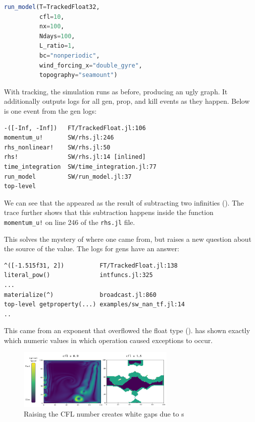 \documentclass{juliacon}
\begin{document}
\begin{lstlisting}[language = Julia]
run_model(T=TrackedFloat32,
          cfl=10,
          nx=100,
          Ndays=100,
          L_ratio=1,
          bc="nonperiodic",
          wind_forcing_x="double_gyre",
          topography="seamount")
\end{lstlisting}

With tracking, the simulation runs as before, producing an ugly graph.
It additionally outputs logs for all gen, prop, and kill events
as they happen.
Below is one event from the gen logs:

\begin{lstlisting}
-([-Inf, -Inf])   FT/TrackedFloat.jl:106
momentum_u!       SW/rhs.jl:246
rhs_nonlinear!    SW/rhs.jl:50
rhs!              SW/rhs.jl:14 [inlined]
time_integration  SW/time_integration.jl:77
run_model         SW/run_model.jl:37
top-level
\end{lstlisting}

We can see that the \NaN{} appeared as the result of subtracting two infinities ().
The trace further shows that this subtraction happens inside the function \texttt{momentum\_u!} on line 246 of the \texttt{rhs.jl} file.

This solves the mystery of where one \NaN{} came from, but raises a new question
about the source of the \Inf{} value.
The logs for \Inf{} gens have an answer:

\begin{lstlisting}
^([-1.515f31, 2])          FT/TrackedFloat.jl:138
literal_pow()              intfuncs.jl:325
...
materialize(^)             broadcast.jl:860
top-level getproperty(...) examples/sw_nan_tf.jl:14
..
\end{lstlisting}
%
This \Inf{} came from an exponent that overflowed the float type ().
\FT{} has shown exactly which numeric values in which operation
caused exceptions to occur.

\begin{figure}[t]
  \centering
  \includegraphics[width=3in]{./fig/shallow_waters_cfl_diff.pdf}
  \caption{Raising the CFL number creates white gaps due to \NaN{}s}
  \label{fig:sw_nans}
\end{figure}
\end{document}
